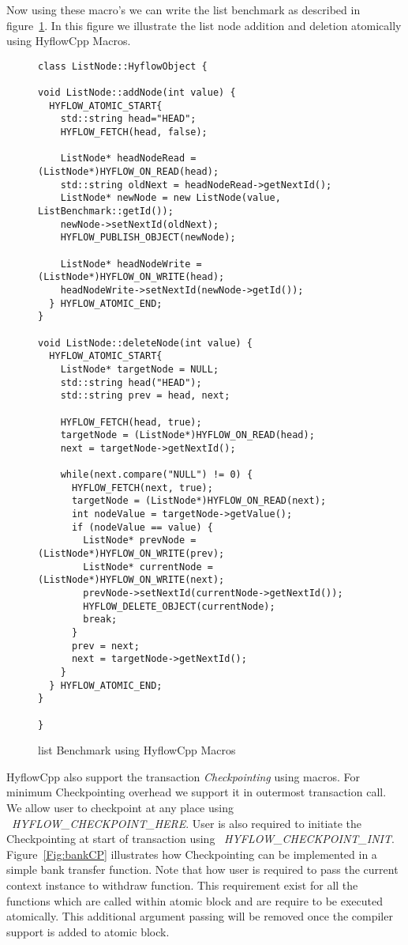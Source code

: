 \documentclass[12pt,english]{report}
\begin{document}
Now using these macro's we can write the list benchmark as described in figure~\ref{Fig:listMacro}. In this figure we illustrate the list node addition and deletion atomically using HyflowCpp Macros. 
\begin{figure}
\centering
\begin{lstlisting}
class ListNode::HyflowObject {

void ListNode::addNode(int value) {
  HYFLOW_ATOMIC_START{
	std::string head="HEAD";
	HYFLOW_FETCH(head, false);

	ListNode* headNodeRead =  (ListNode*)HYFLOW_ON_READ(head);
	std::string oldNext = headNodeRead->getNextId();
	ListNode* newNode = new ListNode(value, ListBenchmark::getId());
	newNode->setNextId(oldNext);
	HYFLOW_PUBLISH_OBJECT(newNode);

	ListNode* headNodeWrite = (ListNode*)HYFLOW_ON_WRITE(head);
	headNodeWrite->setNextId(newNode->getId());
  } HYFLOW_ATOMIC_END;
}

void ListNode::deleteNode(int value) {
  HYFLOW_ATOMIC_START{
	ListNode* targetNode = NULL;
	std::string head("HEAD");
	std::string prev = head, next;

	HYFLOW_FETCH(head, true);
	targetNode = (ListNode*)HYFLOW_ON_READ(head);
	next = targetNode->getNextId();

	while(next.compare("NULL") != 0) {
	  HYFLOW_FETCH(next, true);
	  targetNode = (ListNode*)HYFLOW_ON_READ(next);
	  int nodeValue = targetNode->getValue();
	  if (nodeValue == value) {
		ListNode* prevNode = (ListNode*)HYFLOW_ON_WRITE(prev);
		ListNode* currentNode = (ListNode*)HYFLOW_ON_WRITE(next);
		prevNode->setNextId(currentNode->getNextId());
		HYFLOW_DELETE_OBJECT(currentNode);
		break;
	  }
	  prev = next;
	  next = targetNode->getNextId();
	}
  } HYFLOW_ATOMIC_END;
}

}
\end{lstlisting}
\caption{list Benchmark using HyflowCpp Macros}
\label{Fig:listMacro}
\end{figure}

HyflowCpp also support the transaction \emph{Checkpointing} using macros. For minimum Checkpointing overhead we support it in outermost transaction call. We allow user to checkpoint at any place using ~\emph{HYFLOW{\_}CHECKPOINT{\_}HERE}. User is also required to initiate the Checkpointing at start of transaction using ~\emph{HYFLOW{\_}CHECKPOINT{\_}INIT}. Figure~\ref{Fig:bankCP} illustrates how Checkpointing can be implemented in a simple bank transfer function. Note that how user is required to pass the current context instance to withdraw function. This requirement exist for all the functions which are called within atomic block and are require to be executed atomically. This additional argument passing will be removed once the compiler support is added to atomic block. 
\end{document}
